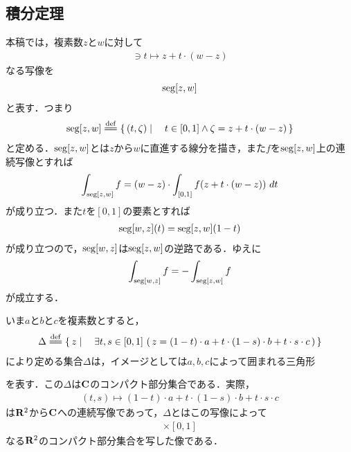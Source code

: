 \subsection{積分定理}
	
	本稿では，複素数$z$と$w$に対して
	\begin{align}
		[0,1] \ni t \longmapsto z + t \cdot (w - z)
	\end{align}
	なる写像を
	\begin{align}
		\operatorname{seg}[z,w]
	\end{align}
	と表す．つまり
	\begin{align}
		\seg{z}{w} \defeq \Set{(t,\zeta)}{t \in [0,1] \wedge \zeta = z + t \cdot (w - z)}
	\end{align}
	と定める．$\operatorname{seg}[z,w]$とは$z$から$w$に直進する線分を描き，また$f$を$\operatorname{seg}[z,w]$上の連続写像とすれば
	\begin{align}
		\int_{\operatorname{seg}[z,w]} f = (w-z) \cdot \int_{[0,1]} f(z + t \cdot (w - z))\ dt
	\end{align}
	が成り立つ．また$t$を$[0,1]$の要素とすれば
	\begin{align}
		\operatorname{seg}[w,z](t) = \operatorname{seg}[z,w](1 - t)
	\end{align}
	が成り立つので，$\operatorname{seg}[w,z]$は$\operatorname{seg}[z,w]$の逆路である．ゆえに
	\begin{align}
		\int_{\operatorname{seg}[w,z]} f = - \int_{\operatorname{seg}[z,w]} f
	\end{align}
	が成立する．
	
	いま$a$と$b$と$c$を複素数とすると，
	\begin{align}
		\Delta \defeq \Set{z}{\exists t,s \in [0,1]\, 
		\left(\, z = (1-t) \cdot a 
		+ t \cdot (1-s) \cdot b 
		+ t \cdot s \cdot c\, \right)}
	\end{align}
	により定める集合$\Delta$は，イメージとしては$a,b,c$によって囲まれる三角形
	
	\begin{center}
	\end{center}
	
	を表す．この$\Delta$は$\mathbf{C}$のコンパクト部分集合である．実際，
	\begin{align}
		(t,s) \longmapsto (1-t) \cdot a + t \cdot (1-s) \cdot b + t \cdot s \cdot c
	\end{align}
	は$\mathbf{R}^2$から$\mathbf{C}$への連続写像であって，$\Delta$とはこの写像によって
	\begin{align}
		[0,1] \times [0,1]
	\end{align}
	なる$\mathbf{R}^2$のコンパクト部分集合を写した像である．
	
